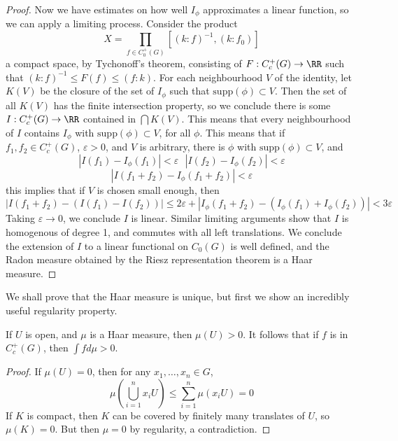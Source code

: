 \begin{proof}
    Now we have estimates on how well $I_\phi$ approximates a linear function, so we can apply a limiting process. Consider the product
    \[ X = \prod_{f \in C^+_0(G)} [(k : f)^{-1}, (k: f_0)] \]
    a compact space, by Tychonoff's theorem, consisting of $F: C_c^+(G) \to \RR$ such that $(k : f)^{-1} \leq F(f) \leq (f: k)$. For each neighbourhood $V$ of the identity, let $K(V)$ be the closure of the set of $I_\phi$ such that $\text{supp}(\phi) \subset V$. Then the set of all $K(V)$ has the finite intersection property, so we conclude there is some $I: C_c^+(G) \to \RR$ contained in $\bigcap K(V)$. This means that every neighbourhood of $I$ contains $I_\phi$ with $\text{supp}(\phi) \subset V$, for all $\phi$. This means that if $f_1, f_2 \in C_c^+(G)$, $\varepsilon > 0$, and $V$ is arbitrary, there is $\phi$ with $\text{supp}(\phi) \subset V$, and
    \[ |I(f_1) - I_\phi(f_1)| < \varepsilon\ \ \ |I(f_2) - I_\phi(f_2)| < \varepsilon \]
    \[ |I(f_1 + f_2) - I_\phi(f_1 + f_2)| < \varepsilon \]
    this implies that if $V$ is chosen small enough, then
    \[ |I(f_1 + f_2) - (I(f_1) - I(f_2))| \leq 2 \varepsilon + |I_\phi(f_1 + f_2) - (I_\phi(f_1) + I_\phi(f_2))| < 3 \varepsilon \]
    Taking $\varepsilon \to 0$, we conclude $I$ is linear. Similar limiting arguments show that $I$ is homogenous of degree 1, and commutes with all left translations. We conclude the extension of $I$ to a linear functional on $C_0(G)$ is well defined, and the Radon measure obtained by the Riesz representation theorem is a Haar measure.
\end{proof}

We shall prove that the Haar measure is unique, but first we show an incredibly useful regularity property.

\begin{prop}
    If $U$ is open, and $\mu$ is a Haar measure, then $\mu(U) > 0$. It follows that if $f$ is in $C_c^+(G)$, then $\int f d \mu > 0$.
\end{prop}
\begin{proof}
    If $\mu(U) = 0$, then for any $x_1, \dots, x_n \in G$,
    \[ \mu \left( \bigcup_{i = 1}^n x_i U \right) \leq \sum_{i = 1}^n \mu(x_i U) = 0 \]
    If $K$ is compact, then $K$ can be covered by finitely many translates of $U$, so $\mu(K) = 0$. But then $\mu = 0$ by regularity, a contradiction.
\end{proof}

